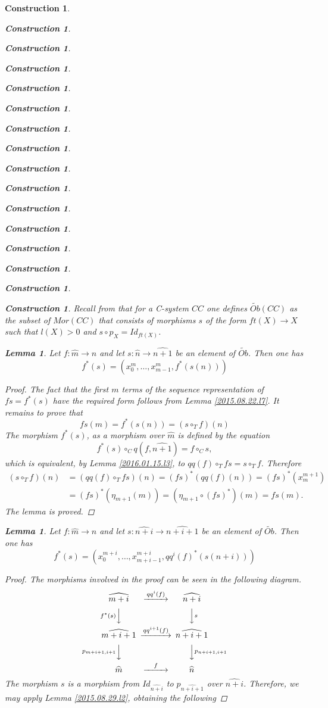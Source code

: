 \documentclass[onecolumn,12pt]{amsart}
\newtheorem{lemma}[proposition]{Lemma}
\numberwithin{proposition}{subsection}
\newtheorem{construction}[proposition]{Construction}
\newcommand{\sr}{\rightarrow}
\newcommand{\wt}{\widetilde}
\newcommand{\wh}{\widehat}
\newcommand{\mbind}[1]{{#1^*}}
\newcommand{\hc}{\circ_{T}}
\begin{document}
\begin{construction}
\begin{construction}
\begin{construction}
\begin{construction}
\begin{construction}
\begin{construction}
\begin{construction}
\begin{construction}
\begin{construction}
\begin{construction}
\begin{construction}
\begin{construction}
\begin{construction}
\begin{construction}
\begin{construction}
\begin{construction}
Recall from \cite{Csubsystems} that for a C-system $CC$ one defines
$\wt{Ob}(CC)$ as the subset of $Mor(CC)$ that consists of morphisms $s$ of the
form $ft(X)\sr X$ such that $l(X)>0$ and $s\circ p_X=Id_{ft(X)}$.
%
\begin{lemma}
\label{2015.08.24.l1}
Let $f:\wh{m}\sr\wh{n}$ and let $s:\wh{n}\sr\wh{n+1}$ be an element of $\wt{Ob}$. Then one has
%
$$f^*(s)=(x_0^m,\dots,x_{m-1}^m,\mbind{f}(s(n)))$$
%
\end{lemma}
%
\begin{proof}
The fact that the first $m$ terms of the sequence representation of $fs=f^*(s)$
have the required form follows from Lemma \ref{2015.08.22.l7}. It remains to
prove that
%
$$fs(m)=\mbind{f}(s(n))=(s\hc f)(n)$$
%
The morphism $f^*(s)$, as a morphism over $\wh{m}$ is defined by the equation
%
$$f^*(s)\circ_C q(f,\wh{n+1})=f\circ_C s,$$
%
which is equivalent, by Lemma \ref{2016.01.15.l3},  to $qq(f)\hc fs=s\hc f$. Therefore 
%
\begin{equation*}
  \begin{split}
    (s\hc f)(n)&=(qq(f)\hc fs)(n)=\mbind{(fs)}(qq(f)(n))=\mbind{(fs)}(x_m^{m+1})
    \\&
    = \mbind{(fs)}(\eta_{m+1}(m))
    = (\eta_{m+1}\circ\mbind{(fs)})(m)=fs(m).
  \end{split}
\end{equation*}
%
The lemma is proved.
\end{proof}
%
\begin{lemma}
\label{2015.08.29.l1}
Let $f:\wh{m}\sr\wh{n}$ and let $s:\wh{n+i}\sr\wh{n+i+1}$ be an element of $\wt{Ob}$. Then one has
%
\begin{equation}\label{2015.08.29.eq1}
f^*(s)=(x_0^{m+i},\dots,x_{m+i-1}^{m+i},\mbind{qq^i(f)}(s(n+i)))
\end{equation}%
%
\end{lemma}
%
\begin{proof}
The morphisms involved in the proof can be seen in the following diagram.
%
$$
\begin{CD}
\wh{m+i} @>qq^i(f)>> \wh{n+i}\\
@Vf^*(s)VV @VVsV\\
\wh{m+i+1} @>qq^{i+1}(f)>> \wh{n+i+1}\\
@Vp_{m+i+1,i+1}VV @VVp_{n+i+1,i+1}V\\
\wh{m} @>f>> \wh{n}
\end{CD}
$$
%
The morphism $s$ is a morphism from $Id_{\wh{n+i}}$ to $p_{\wh{n+i+1}}$ over
$\wh{n+i}$. Therefore, we may apply Lemma \ref{2015.08.29.l2}, obtaining the following

\end{proof}
\end{construction}
\end{construction}
\end{construction}
\end{construction}
\end{construction}
\end{construction}
\end{construction}
\end{construction}
\end{construction}
\end{construction}
\end{construction}
\end{construction}
\end{construction}
\end{construction}
\end{construction}
\end{construction}
\end{document}
